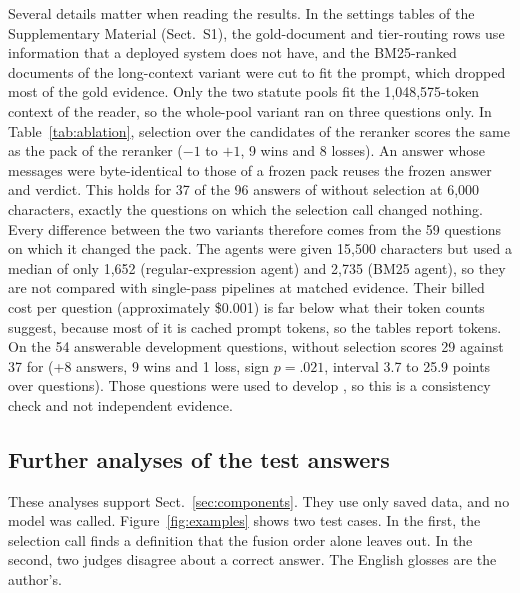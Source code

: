 Several details matter when reading the results.
In the settings tables of the Supplementary Material (Sect.~S1), the gold-document and tier-routing rows use information that a deployed system does not have, and the BM25-ranked documents of the long-context variant were cut to fit the prompt, which dropped most of the gold evidence.
Only the two statute pools fit the 1,048,575-token context of the reader, so the whole-pool variant ran on three questions only.
In Table~\ref{tab:ablation}, selection over the candidates of the reranker scores the same as the pack of the reranker ($-1$ to $+1$, 9 wins and 8 losses).
An answer whose messages were byte-identical to those of a frozen pack reuses the frozen answer and verdict.
This holds for 37 of the 96 answers of \lexb{} without selection at 6,000 characters, exactly the questions on which the selection call changed nothing. Every difference between the two variants therefore comes from the 59 questions on which it changed the pack.
The agents were given 15,500 characters but used a median of only 1,652 (regular-expression agent) and 2,735 (BM25 agent), so they are not compared with single-pass pipelines at matched evidence.
Their billed cost per question (approximately \$0.001) is far below what their token counts suggest, because most of it is cached prompt tokens, so the tables report tokens.
On the 54 answerable development questions, \lexb{} without selection scores 29 against 37 for \lexb{} (+8 answers, 9 wins and 1 loss, sign $p=.021$, interval 3.7 to 25.9 points over questions).
Those questions were used to develop \lexb{}, so this is a consistency check and not independent evidence.

\subsection{Further analyses of the test answers}
\label{app:analysis}
These analyses support Sect.~\ref{sec:components}.
They use only saved data, and no model was called.
Figure~\ref{fig:examples} shows two test cases.
In the first, the selection call finds a definition that the fusion order alone leaves out.
In the second, two judges disagree about a correct answer.
The English glosses are the author's.


